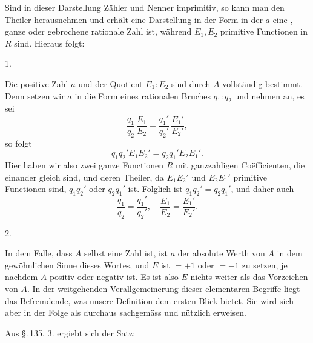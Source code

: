 
Sind in dieser Darstellung Zähler und Nenner imprimitiv, so
kann man den Theiler herausnehmen und erhält eine Darstellung
in der Form
in der $a$ eine , ganze oder gebrochene rationale Zahl
ist, während $E_1, E_2$ primitive Functionen in $R$ sind. Hieraus
folgt:

1. 

Die positive Zahl $a$ und der Quotient $E_1:E_2$ sind durch $A$
vollständig bestimmt. Denn setzen wir $a$ in die Form eines
rationalen Bruches $q_1:q_2$ und nehmen an, es sei
\[
\frac{q_1}{q_2}\,\frac{E_1}{E_2} = \frac{q_1'}{q_2'}\,\frac{E_1'}{E_2'},
\]
so folgt
\[
q_1 q_2' E_1 E_2' = q_2 q_1' E_2 E_1'.
\]
Hier haben wir also zwei ganze Functionen $R$ mit ganzzahligen
Co\"efficienten, die einander gleich sind, und deren Theiler, da
$E_1 E_2'$ und $E_2 E_1'$ primitive Functionen sind, $q_1 q_2'$
oder $q_2 q_1'$ ist. Folglich ist $q_1 q_2' = q_2 q_1'$, und daher
auch
\[
\frac{q_1}{q_2} = \frac{q_1'}{q_2'}, \quad \frac{E_1}{E_2} = \frac{E_1'}{E_2'}.
\]

2. 

In dem Falle, dass $A$ selbst eine Zahl ist, ist $a$ der absolute
Werth von $A$ in dem gewöhnlichen Sinne dieses Wortes, und $E$
ist $= +1$ oder $= -1$ zu setzen, je nachdem $A$ positiv oder
negativ ist. Es ist also $E$ nichts weiter als das Vorzeichen von
$A$. In der weitgehenden Verallgemeinerung dieser elementaren
Begriffe liegt das Befremdende, was unsere Definition dem ersten
Blick bietet. Sie wird sich aber in der Folge als durchaus
sachgemäss und nützlich erweisen.

Aus \S.\,135, 3. ergiebt sich der Satz:
